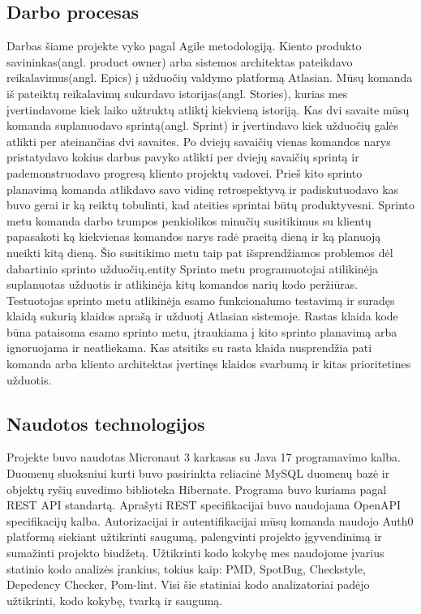 \documentclass{VUMIFPSkursinis}
\begin{document}
	\subsection{Darbo procesas}
		Darbas šiame projekte vyko pagal Agile metodologiją.
		Kiento produkto savininkas(angl. product owner) arba sistemos architektas pateikdavo reikalavimus(angl. Epics) 
		į užduočių valdymo platformą Atlasian. Mūsų komanda iš pateiktų reikalavimų sukurdavo istorijas(angl. Stories),
		kurias mes įvertindavome kiek laiko užtruktų atliktį kiekvieną istoriją.
		Kas dvi savaite mūsų komanda suplanuodavo sprintą(angl. Sprint) ir įvertindavo kiek užduočių galės atlikti per ateinančias dvi savaites.
		Po dviejų savaičių vienas komandos narys pristatydavo kokius darbus pavyko atlikti per dviejų savaičių sprintą ir pademonstruodavo progresą kliento projektų vadovei.
		Prieš kito sprinto planavimą komanda atlikdavo savo vidinę retrospektyvą ir padiskutuodavo kas buvo gerai ir ką reiktų tobulinti, kad ateities sprintai būtų produktyvesni.
		Sprinto metu komanda darbo trumpos penkiolikos minučių susitikimus su klientų papasakoti ką kiekvienas komandos
		narys radė praeitą dieną ir ką planuoją nueikti kitą dieną.
		Šio susitikimo metu taip pat išsprendžiamos problemos dėl dabartinio sprinto užduočių.entity
		Sprinto metu programuotojai atilikinėja suplanuotas užduotis ir atlikinėja kitų komandos narių kodo peržiūras.
		Testuotojas sprinto metu atlikinėja esamo funkcionalumo testavimą ir suradęs klaidą sukurią klaidos aprašą ir užduotį Atlasian sistemoje.
		Rastas klaida kode būna pataisoma esamo sprinto metu, įtraukiama į kito sprinto planavimą arba ignoruojama ir 
		neatliekama.
		Kas atsitiks su rasta klaida nusprendžia pati komanda arba kliento architektas įvertinęs klaidos svarbumą ir kitas prioritetines užduotis.
		
	\subsection{Naudotos technologijos}
		Projekte buvo naudotas Micronaut 3 karkasas su Java 17 programavimo kalba.
		Duomenų sluoksniui kurti buvo pasirinkta reliacinė MySQL duomenų bazė ir objektų ryšių suvedimo biblioteka Hibernate.
		Programa buvo kuriama pagal REST API standartą. Aprašyti REST specifikacijai buvo naudojama OpenAPI specifikacijų kalba.
		Autorizacijai ir autentifikacijai mūsų komanda naudojo Auth0 platformą siekiant užtikrinti saugumą, palengvinti projekto įgyvendinimą ir sumažinti projekto 
		biudžetą.
		Užtikrinti kodo kokybę mes naudojome įvarius statinio kodo analizės įrankius, tokius kaip: PMD, SpotBug, Checkstyle, Depedency Checker, Pom-lint.
		Visi šie statiniai kodo analizatoriai padėjo užtikrinti, kodo kokybę, tvarką ir saugumą.
		
\end{document}
